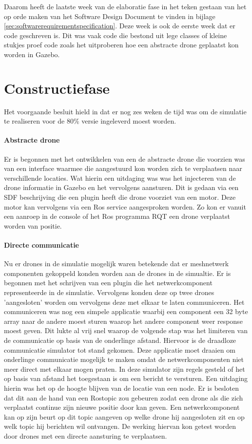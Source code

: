 \documentclass[a4paper, 11pt, oneside]{report}
\begin{document}
Daarom heeft de laatste week van de elaboratie fase in het teken gestaan van het op orde maken van het Software Design Document te vinden in bijlage  \ref{sec:softwarerequirementspecification}.
Deze week is ook de eerste week dat er code geschreven is. 
Dit was vaak code die bestond uit lege classes of kleine stukjes proef code zoals het uitproberen hoe een abstracte drone geplaatst kon worden in Gazebo.

\section{Constructiefase}\label{sec:constructiefase}
Het voorgaande besluit hield in dat er nog zes weken de tijd was om de simulatie te realiseren voor de 80\% versie ingeleverd moest worden.
\paragraph{Abstracte drone}
Er is begonnen met het ontwikkelen van een de abstracte drone die voorzien was van een interface waarmee die aangestuurd kon worden zich te verplaatsen naar verschillende locaties. Wat hierin een uitdaging was was het injecteren van de drone informatie in Gazebo en het vervolgens aansturen. Dit is gedaan via een SDF beschrijving die een plugin heeft die drone voorziet van een motor. Deze motor kan vervolgens via een Ros service aangesproken worden. Zo kon er vanuit een aanroep in de console of het Ros programma RQT een drone verplaatst worden van positie. 
\paragraph{Directe communicatie}
Nu er drones in de simulatie mogelijk waren betekende dat er meshnetwerk componenten gekoppeld konden worden aan de drones in de simualtie.
Er is begonnen met het schrijven van een plugin die het netwerkcomponent representeerde in de simulatie. 
Vervolgens konden deze op twee drones 'aangesloten' worden om vervolgens deze met elkaar te laten communiceren.
Het communiceren was nog een simpele applicatie waarbij een component een 32 byte array naar de andere moest sturen waarop het andere component weer response moest geven.
Dit lukte al vrij snel waarop de volgende stap was het limiteren van de communicatie op basis van de onderlinge afstand.
Hiervoor is de draadloze communicatie simulator tot stand gekomen. 
Deze applicatie moet draaien om onderlinge communicatie mogelijk te maken omdat de netwerkcomponenten niet meer direct met elkaar mogen praten.
In deze simulator zijn regels gesteld of het op basis van afstand het toegestaan is om een bericht te versturen.
Een uitdaging hierin was het op de hoogte blijven van de locatie van een node. 
Er is besloten dat dit aan de hand van een Rostopic zou gebeuren zodat een drone als die zich verplaatst continue zijn nieuwe positie door kan geven. Een netwerkcomponent kan op zijn beurt op dit topic aangeven op welke drone hij aangesloten zit en op welk topic hij berichten wil ontvangen. De werking hiervan kon getest worden door drones met een directe aansturing te verplaatsen.
\end{document}
